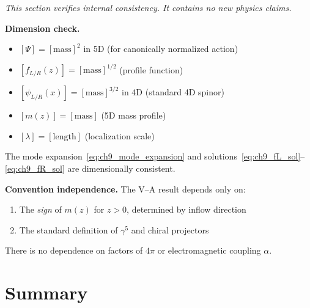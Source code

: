 \begin{tcolorbox}[colback=gray!5!white, colframe=gray!60!black,
    title=\textbf{Consistency Check (Not a Derivation)}]
\emph{This section verifies internal consistency. It contains no new physics claims.}

\medskip
\textbf{Dimension check.}
\begin{itemize}[nosep]
    \item $[\Psi] = [\text{mass}]^2$ in 5D (for canonically normalized action)
    \item $[f_{L/R}(z)] = [\text{mass}]^{1/2}$ (profile function)
    \item $[\psi_{L/R}(x)] = [\text{mass}]^{3/2}$ in 4D (standard 4D spinor)
    \item $[m(z)] = [\text{mass}]$ (5D mass profile)
    \item $[\lambda] = [\text{length}]$ (localization scale)
\end{itemize}
The mode expansion~\eqref{eq:ch9_mode_expansion} and solutions~\eqref{eq:ch9_fL_sol}--\eqref{eq:ch9_fR_sol} are dimensionally consistent.

\medskip
\textbf{Convention independence.}
The V–A result depends only on:
\begin{enumerate}[nosep]
    \item The \emph{sign} of $m(z)$ for $z > 0$, determined by inflow direction
    \item The standard definition of $\gamma^5$ and chiral projectors
\end{enumerate}
There is no dependence on factors of $4\pi$ or electromagnetic coupling $\alpha$.
\end{tcolorbox}

\section{Summary}
\label{sec:ch9_summary}


